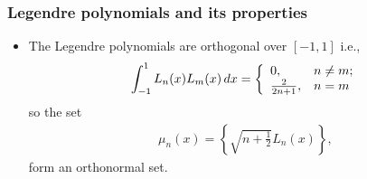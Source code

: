 \documentclass{beamer}
\begin{document}
\begin{frame}\frametitle{Legendre polynomials and its properties}
	\begin{itemize}	
		\justifying
\item The Legendre polynomials are orthogonal over $[-1, 1]$ i.e.,
\begin{eqnarray}
\int_{-1}^1 L_{n}(x) L_{m}(x) \, dx=\left\{
\begin{array}{ll}
0, & \hbox{$n \neq m$;} \\
\frac{2}{2n+1}, & \hbox{$n=m$}
\end{array}
\right.
\end{eqnarray}
so the set
\begin{eqnarray}
\mu _n(x)=\left\{\sqrt{ n+\frac{1}{2}}L_n(x)\right\},\nonumber
\end{eqnarray}
\small
form an orthonormal set.
\end{itemize}
\end{frame}	
\end{document}
